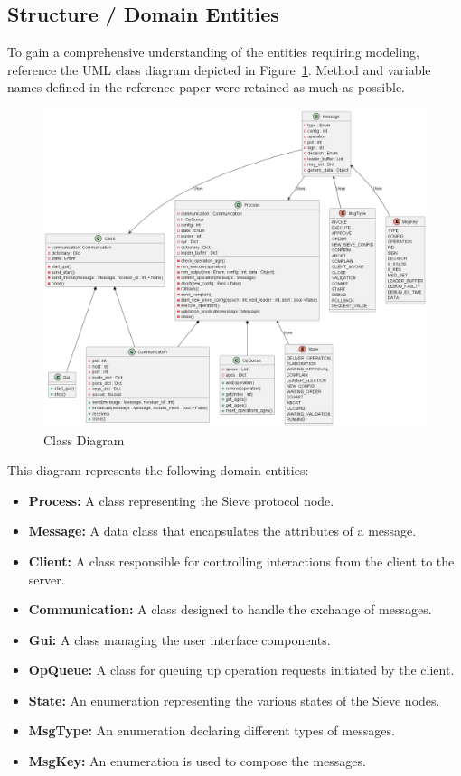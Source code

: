 \documentclass{scrartcl}
\begin{document}
\subsection{Structure / Domain Entities}
To gain a comprehensive understanding of the entities requiring modeling, reference the UML class diagram depicted in Figure~\ref{fig:classes}. Method and variable names defined in the reference paper \cite{paper} were retained as much as possible.

\begin{figure}[H]
    \centering
    \includegraphics[width=1\linewidth]{figures/classes.png}
    \caption{Class Diagram}
    \label{fig:classes} 
\end{figure}

This diagram represents the following domain entities:

\begin{itemize}
    \item \textbf{Process:} A class representing the Sieve protocol node.
    \item \textbf{Message:} A data class that encapsulates the attributes of a message.
    \item \textbf{Client:} A class responsible for controlling interactions from the client to the server.
    \item \textbf{Communication:} A class designed to handle the exchange of messages.
    \item \textbf{Gui:} A class managing the user interface components.
    \item \textbf{OpQueue:} A class for queuing up operation requests initiated by the client.
    \item \textbf{State:} An enumeration representing the various states of the Sieve nodes.
    \item \textbf{MsgType:} An enumeration declaring different types of messages.
    \item \textbf{MsgKey:} An enumeration is used to compose the messages.
\end{itemize}
\end{document}
